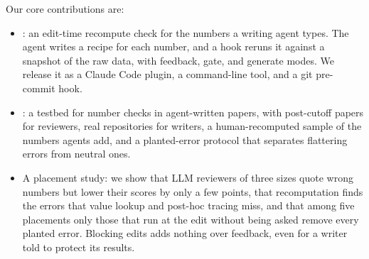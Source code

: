 Our core contributions are:
\begin{itemize}
  \item \tool{}: an edit-time recompute check for the numbers a writing agent types. The agent writes a recipe for
        each number, and a hook reruns it against a snapshot of the raw data, with feedback, gate, and generate
        modes. We release it as a Claude Code plugin, a command-line tool, and a git pre-commit hook.
  \item \bench{}: a testbed for number checks in agent-written papers, with post-cutoff papers for reviewers, real
        repositories for writers, a human-recomputed sample of the numbers agents add, and a planted-error protocol
        that separates flattering errors from neutral ones.
  \item A placement study: we show that LLM reviewers of three sizes quote wrong numbers but lower their scores by only
        a few points, that recomputation finds the errors that value lookup and post-hoc tracing miss, and that
        among five placements only those that run at the edit without being asked remove every planted error. Blocking edits adds nothing over
        feedback, even for a writer told to protect its results.
\end{itemize}

